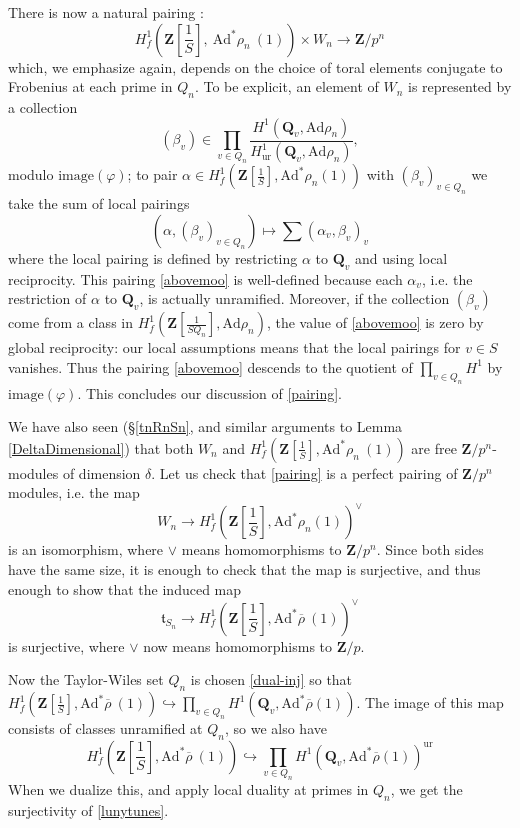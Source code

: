 \documentclass[10pt]{amsart}
\newcommand{\Z}{\mathbf{Z}}
\newcommand{\Ad}{\mathrm{Ad}}
\newcommand{\rhobar}{\overline{\rho}}
\newcommand{\Q}{\mathbf{Q}}
\newcommand{\ramprimes}{S}
\theoremstyle{remark}
\begin{document}
 There is now a natural pairing :\begin{equation} \label{pairing}  H^1_f(\Z[\frac{1}{\ramprimes}], \ \Ad^* \rho_n \ (1)) \times W_n \longrightarrow \Z/p^n \end{equation}
which, we emphasize again, depends on the choice of toral elements conjugate to Frobenius at each prime in $Q_n$. 
To  be explicit,  
an element of $W_n$ is represented by a collection
 $$(\beta_v) \in  \prod_{v \in Q_n} \frac{H^1(\Q_v, \Ad \rho_n)}{H^1_{\mathrm{ur}}(\Q_v, \Ad \rho_n)},$$  modulo $\mathrm{image}(\varphi)$;  
to pair $\alpha \in H^1_f(\Z[\frac{1}{\ramprimes}], \Ad ^* \rho_n(1))$ with  $(\beta_v)_{v \in Q_n}$ 
 we take the sum of local pairings
\begin{equation} \label{abovemoo}   (\alpha, (\beta_v)_{v \in Q_n}) \mapsto \sum (\alpha_v, \beta_v)_v\end{equation}
where the local pairing is defined by restricting $\alpha$ to $\Q_v$ and using local reciprocity. 
This pairing \eqref{abovemoo} is well-defined because each $\alpha_v$, i.e. the restriction of $\alpha$ to $\Q_v$,  is actually unramified.   Moreover, if the collection $(\beta_v)$ come from a class in $H^1_f(\Z[\frac{1}{SQ_n}], \Ad \rho_n)$, 
the value of \eqref{abovemoo} is zero by global reciprocity: our local assumptions means that the local pairings
for $v \in \ramprimes$ vanishes.   Thus the pairing \eqref{abovemoo} descends to the quotient of
$\prod_{v \in Q_n} H^1$ by $\mathrm{image}(\varphi)$. 
 This concludes our discussion of \eqref{pairing}. 
 
We have also seen (\S  \ref{tnRnSn},  and similar arguments to Lemma \ref{DeltaDimensional}) that both $W_n$ and $H^1_f(\Z[\frac{1}{\ramprimes}], \Ad^*  \rho_n \ (1))$ are free $\Z/p^n$-modules of dimension $\delta$. 
Let us check that     \eqref{pairing} is a perfect pairing of $\Z/p^n$ modules, i.e.
the map
$$ W_n \rightarrow H^1_f(\Z[\frac{1}{\ramprimes}], \Ad^* \rho_n (1))^{\vee}$$
is an isomorphism, where $\vee$ means homomorphisms to $\Z/p^n$.   Since both sides have the same size, it is enough to check that the map  
is surjective, and thus enough to show that the induced map
\begin{equation} \label{lunytunes} \mathfrak{t}_{S_n} \rightarrow H^1_f(\Z[\frac{1}{\ramprimes}], \Ad^* \rhobar \ (1))^{\vee}\end{equation} 
is surjective, where $\vee$ now means homomorphisms to $\Z/p$. 

  Now the Taylor-Wiles set $Q_n$ is chosen \eqref{dual-inj} so that 
 $ H^1_f(\Z[\frac{1}{\ramprimes}],  \Ad^* \rhobar \ (1)) \hookrightarrow \prod_{v \in Q_n} H^1(\Q_v, \Ad^* \rhobar(1))$.
 The image of this map consists of classes unramified at $Q_n$, so we also have
  $$H^1_f(\Z[\frac{1}{\ramprimes}], \Ad^* \rhobar\ (1)) \hookrightarrow \prod_{v \in Q_n} H^1(\Q_v, \Ad^* \rhobar(1))^{\mathrm{ur}}$$
When we dualize this, and apply local duality at primes in $Q_n$,  we get the surjectivity of \eqref{lunytunes}. 
\end{document}
